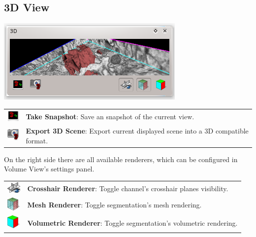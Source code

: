 \subsection{3D View}

\begin{center}
\includegraphics{fig/VolumeView}
\end{center}

\begin{tabular}{m{0.8cm} m{13cm}}
\includegraphics[width=0.7cm]{../../frontend/rsc/snapshot_scene} &
\textbf{Take Snapshot}: Save an snapshot of the current view.\\
\includegraphics[width=0.7cm]{../../frontend/rsc/export_scene} &
\textbf{Export 3D Scene}: Export current displayed scene into a 3D compatible format.\\
\end{tabular}

On the right side there are all available renderers, which can be configured in
Volume View's settings panel.\\

\begin{tabular}{m{0.8cm} m{13cm}}
\includegraphics[width=0.7cm]{../../frontend/rsc/show_planes} &
\textbf{Crosshair Renderer}: Toggle channel's crosshair planes visibility.\\
\includegraphics[width=0.7cm]{../../frontend/rsc/mesh} &
\textbf{Mesh Renderer}: Toggle segmentation's mesh rendering.\\
\includegraphics[width=0.7cm]{../../frontend/rsc/voxel} &
\textbf{Volumetric Renderer}: Toggle segmentation's volumetric rendering.\\
\end{tabular}
\vspace{0.3cm}

